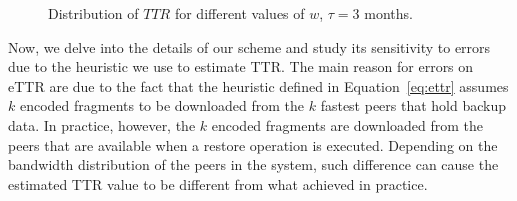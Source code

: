  \begin{figure}[ht!]
  \centering
 \caption{Distribution of $TTR$ for different values of $w$, $\tau=3$ months.}
 \label{fig:ttr}
\end{figure}
 
Now, we delve into the details of our scheme and study its sensitivity
to errors due to the heuristic we use to estimate TTR. The main
reason for errors on eTTR are due to the fact that the heuristic
defined in Equation~\ref{eq:ettr} assumes $k$ encoded fragments to be
downloaded from the $k$ fastest peers that hold backup data. In
practice, however, the $k$ encoded fragments are downloaded from the
peers that are available when a restore operation is
executed. Depending on the bandwidth distribution of the peers in the
system, such difference can cause the estimated TTR value to be
different from what achieved in practice.


